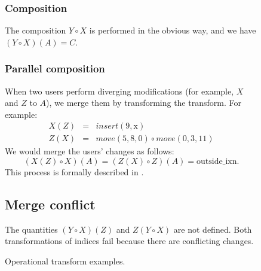 \documentclass[11pt,titlepage]{article}
\begin{document}
\begin{figure}[h]
\begin{minipage}{\textwidth}
\begin{multicols}{2}
      \subsubsection*{Composition}
      The composition \(Y \circ X\) is performed in the obvious way,
      and we have \((Y \circ X)(A) = C\).
      \subsubsection*{Parallel composition}
      When two users perform diverging modifications (for example,
      \(X\) and \(Z\) to \(A\)), we merge them by transforming the
      transform.  For example:
      \begin{eqnarray*}
        X(Z) &=& insert(9, \mathrm{x}) \\
        Z(X) &=& move(5, 8, 0) \circ move(0, 3, 11)
      \end{eqnarray*}
      We would merge the users' changes as follows: \[(X(Z) \circ
      X)(A) = (Z(X) \circ Z)(A) = \mathrm{outside\_ixn}.\] This
      process is formally described in \cite{ot}.
      \subsection*{Merge conflict}
      The quantities \((Y \circ X)(Z)\) and \(Z(Y \circ X)\) are not
      defined.  Both transformations of indices fail because there are
      conflicting changes.
    \end{multicols}
  \end{minipage}
  \caption{Operational transform examples.}
  \label{fig:ot}
\end{figure}
\end{document}
